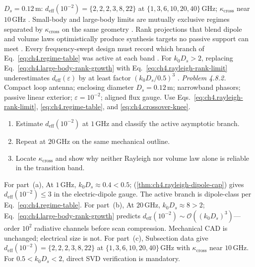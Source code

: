 \(D_{s}=0.12\,\mathrm{m}\): \(d_{\mathrm{eff}}(10^{-2})=\{2,2,2,3,8,22\}\) at \(\{1,3,6,10,20,40\}\,\mathrm{GHz}\); \(\kappa_{\mathrm{cross}}\) near
\(10\,\mathrm{GHz}\) \cite{jackson1999}.
Small-body and large-body limits are mutually exclusive regimes separated by \(\kappa_{\mathrm{cross}}\) on the same geometry
\cite{jackson1999}. Rank projections that blend dipole and volume laws optimistically produce synthesis targets
no passive support can meet \cite{devaney2004}. Every frequency-swept design must record which branch of Eq.~\eqref{eq:ch4.regime-table} was active at
each band \cite{stratton1941}.
\label{cor:ch4.no-dipole-extrap}
For \(k_{0}D_{s}>2\), replacing Eq.~\eqref{eq:ch4.large-body-rank-growth} with Eq.~\eqref{eq:ch4.rayleigh-rank-limit} underestimates
\(d_{\mathrm{eff}}(\varepsilon)\) by at least factor \((k_{0}D_{s}/0.5)^{3}\) \cite{jackson1999}.
\emph{Problem 4.8.2.} Compact loop antenna; enclosing diameter $D_{s}=0.12\,\mathrm{m}$; narrowband phasors; passive linear exterior; $\varepsilon=10^{-2}$; aligned flux gauge. Use Eqs.~\eqref{eq:ch4.rayleigh-rank-limit}, \eqref{eq:ch4.regime-table}, and \eqref{eq:ch4.crossover-knee}.
\begin{enumerate}
\item[(a)] Estimate $d_{\mathrm{eff}}(10^{-2})$ at $1\,\mathrm{GHz}$ and classify the active asymptotic branch.
\item[(b)] Repeat at $20\,\mathrm{GHz}$ on the same mechanical outline.
\item[(c)] Locate $\kappa_{\mathrm{cross}}$ and show why neither Rayleigh nor volume law alone is reliable in the transition band.
\end{enumerate}
For part~(a), At $1\,\mathrm{GHz}$, $k_{0}D_{s}\approx0.4<0.5$; (\ref{thm:ch4.rayleigh-dipole-cap}) gives $d_{\mathrm{eff}}(10^{-2})\le3$ in the electric-dipole gauge. The active branch is dipole-class per Eq.~\eqref{eq:ch4.regime-table}.
For part~(b), At $20\,\mathrm{GHz}$, $k_{0}D_{s}\approx8>2$; Eq.~\eqref{eq:ch4.large-body-rank-growth} predicts $d_{\mathrm{eff}}(10^{-2})\sim\mathcal{O}((k_{0}D_{s})^{3})$---order $10^{2}$ radiative channels before scan compression. Mechanical CAD is unchanged; electrical size is not.
For part~(c), Subsection data give $d_{\mathrm{eff}}(10^{-2})=\{2,2,2,3,8,22\}$ at $\{1,3,6,10,20,40\}\,\mathrm{GHz}$ with $\kappa_{\mathrm{cross}}$ near $10\,\mathrm{GHz}$. For $0.5<k_{0}D_{s}<2$, direct SVD verification is mandatory.
